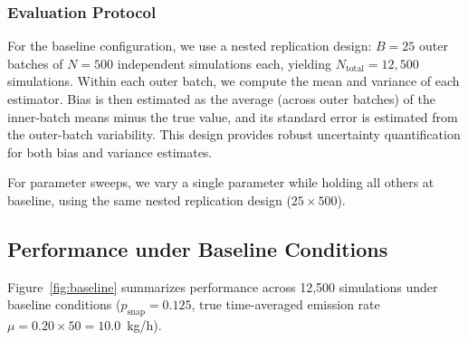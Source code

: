 \documentclass[numsec,webpdf,modern,mediumone]{oup-authoring-template}
\newcommand{\edit}[1]{#1}
\begin{document}
\subsubsection{Evaluation Protocol}

For the baseline configuration, we use a nested replication design: $B = 25$ outer batches of $N = 500$ independent simulations each, yielding $N_{\text{total}} = 12{,}500$ simulations. Within each outer batch, we compute the mean and variance of each estimator. Bias is then estimated as the average (across outer batches) of the inner-batch means minus the true value, and its standard error is estimated from the outer-batch variability. This design provides robust uncertainty quantification for both bias and variance estimates.

For parameter sweeps, we vary a single parameter while holding all others at baseline, using the same nested replication design ($25 \times 500$).


\subsection{Performance under Baseline Conditions}
\label{sec:baseline_performance}

\edit{Figure~\ref{fig:baseline} summarizes performance across 12{,}500 simulations under baseline conditions ($p_{\text{snap}} = 0.125$, true time-averaged emission rate $\mu = 0.20 \times 50 = 10.0$~kg/h).}
\end{document}
